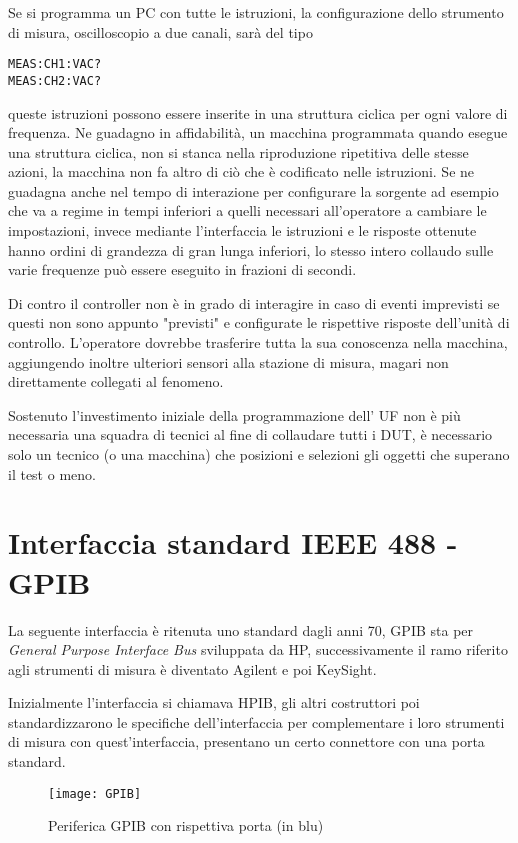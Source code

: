 Se si programma un PC con tutte le istruzioni, la configurazione dello
strumento di misura, oscilloscopio a due canali, sarà del tipo

\begin{verbatim}
MEAS:CH1:VAC?
MEAS:CH2:VAC?
\end{verbatim}

queste istruzioni possono essere inserite in una struttura ciclica per ogni
valore di frequenza. Ne guadagno in affidabilità, un macchina programmata
quando esegue una struttura ciclica, non si stanca nella riproduzione
ripetitiva delle stesse azioni, la macchina non fa altro di ciò che è
codificato nelle istruzioni.
Se ne guadagna anche nel tempo di interazione per
configurare la sorgente ad esempio che va a regime in tempi inferiori a quelli
necessari all'operatore a cambiare le impostazioni, invece mediante
l'interfaccia le istruzioni e le risposte ottenute hanno ordini di grandezza di
gran lunga inferiori, lo stesso intero collaudo sulle varie frequenze può essere
eseguito in frazioni di secondi.

Di contro il controller non è in grado di interagire in caso di eventi
imprevisti se questi non
sono appunto "previsti" e configurate le rispettive risposte dell'unità di
controllo.
L'operatore dovrebbe trasferire tutta la sua conoscenza nella macchina,
aggiungendo inoltre
ulteriori sensori alla stazione di misura, magari non direttamente collegati al
fenomeno.

Sostenuto l'investimento iniziale della programmazione dell' UF non è più
necessaria una squadra di
tecnici al fine di collaudare tutti i DUT, è necessario solo un tecnico (o una
macchina) che
posizioni e selezioni gli oggetti che superano il test o meno.

\section{Interfaccia standard IEEE 488 - GPIB}
La seguente interfaccia è ritenuta uno standard dagli anni 70, GPIB sta per
\textit{General Purpose Interface Bus} sviluppata da HP, successivamente il
ramo riferito agli strumenti di misura è diventato Agilent e poi KeySight.

Inizialmente l'interfaccia si chiamava HPIB, gli altri costruttori poi
standardizzarono le specifiche dell'interfaccia per complementare i loro
strumenti di misura con quest'interfaccia, presentano un certo connettore con
una porta standard.
\begin{figure}[h]
\centering
\texttt{[image: GPIB]}
\caption{Periferica GPIB con rispettiva porta (in blu)}
\end{figure}


